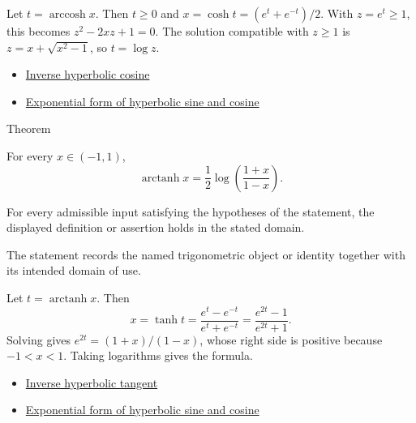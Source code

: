 \begin{remark*}[Proof]
Let $t=\operatorname{arccosh}x$. Then $t\geq 0$ and
$x=\cosh t=(e^t+e^{-t})/2$. With $z=e^t\geq 1$, this becomes
$z^2-2xz+1=0$. The solution compatible with $z\geq 1$ is
$z=x+\sqrt{x^2-1}$, so $t=\log z$.
\end{remark*}
\begin{dependencies}
\begin{itemize}
  \item \hyperref[def:inverse-hyperbolic-cosine]{Inverse hyperbolic cosine}
  \item \hyperref[thm:hyperbolic-exponential-form]{Exponential form of hyperbolic sine and cosine}
\end{itemize}
\end{dependencies}

\begin{theorembox}{Theorem}
\begin{theorem}
\label{thm:inverse-hyperbolic-tangent-log-form}
For every $x\in(-1,1)$,
\[
  \operatorname{arctanh} x=\frac{1}{2}\log\!\left(\frac{1+x}{1-x}\right).
\]
\end{theorem}
\end{theorembox}
\begin{remark*}
For every admissible input satisfying the hypotheses of the statement, the
displayed definition or assertion holds in the stated domain.
\end{remark*}

\begin{remark*}[Interpretation]
The statement records the named trigonometric object or identity together with
its intended domain of use.
\end{remark*}

\begin{remark*}[Proof]
Let $t=\operatorname{arctanh}x$. Then
\[
  x=\tanh t=\frac{e^t-e^{-t}}{e^t+e^{-t}}
  =\frac{e^{2t}-1}{e^{2t}+1}.
\]
Solving gives $e^{2t}=(1+x)/(1-x)$, whose right side is positive because
$-1<x<1$. Taking logarithms gives the formula.
\end{remark*}
\begin{dependencies}
\begin{itemize}
  \item \hyperref[def:inverse-hyperbolic-tangent]{Inverse hyperbolic tangent}
  \item \hyperref[thm:hyperbolic-exponential-form]{Exponential form of hyperbolic sine and cosine}
\end{itemize}
\end{dependencies}

